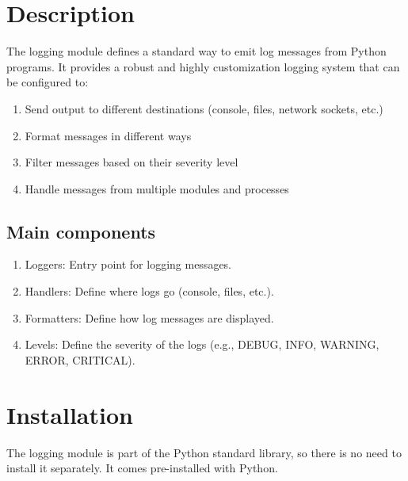 
\section{Description}

The logging module defines a standard way to emit log messages from Python
programs. It provides a robust and highly customization logging system that can
be configured to:\cite{Python:2024Logging}

\begin{enumerate}
	\item Send output to different destinations (console, files, network sockets, etc.)
	\item Format messages in different ways
	\item Filter messages based on their severity level
	\item Handle messages from multiple modules and processes
\end{enumerate}


\subsection{Main components}
\begin{enumerate}
	\item Loggers: Entry point for logging messages.
	\item Handlers: Define where logs go (console, files, etc.).
	\item Formatters: Define how log messages are displayed.
	\item Levels: Define the severity of the logs (e.g., DEBUG, INFO, WARNING, ERROR, CRITICAL).
\end{enumerate}

\section{Installation}

The logging module is part of the Python standard library, so there is no need to install it separately. It comes pre-installed with Python.\cite{python_packages}

